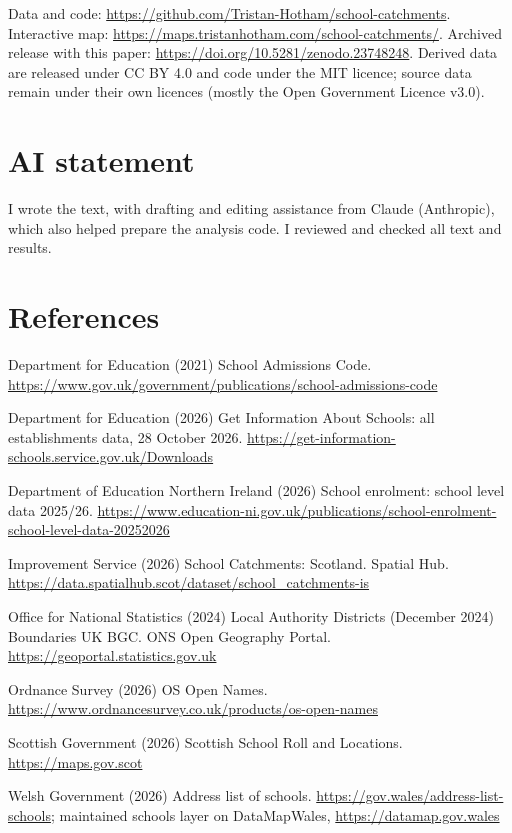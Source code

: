 \documentclass[11pt,a4paper]{article}
\begin{document}
Data and code: \url{https://github.com/Tristan-Hotham/school-catchments}. Interactive map: \url{https://maps.tristanhotham.com/school-catchments/}. Archived release with this paper: \url{https://doi.org/10.5281/zenodo.23748248}. Derived data are released under CC BY 4.0 and code under the MIT licence; source data remain under their own licences (mostly the Open Government Licence v3.0).

\section*{AI statement}

I wrote the text, with drafting and editing assistance from Claude (Anthropic), which also helped prepare the analysis code. I reviewed and checked all text and results.

\section*{References}
\small
Department for Education (2021) School Admissions Code. \url{https://www.gov.uk/government/publications/school-admissions-code}

Department for Education (2026) Get Information About Schools: all establishments data, 28 October 2026. \url{https://get-information-schools.service.gov.uk/Downloads}

Department of Education Northern Ireland (2026) School enrolment: school level data 2025/26. \url{https://www.education-ni.gov.uk/publications/school-enrolment-school-level-data-20252026}

Improvement Service (2026) School Catchments: Scotland. Spatial Hub. \url{https://data.spatialhub.scot/dataset/school_catchments-is}

Office for National Statistics (2024) Local Authority Districts (December 2024) Boundaries UK BGC. ONS Open Geography Portal. \url{https://geoportal.statistics.gov.uk}

Ordnance Survey (2026) OS Open Names. \url{https://www.ordnancesurvey.co.uk/products/os-open-names}

Scottish Government (2026) Scottish School Roll and Locations. \url{https://maps.gov.scot}

Welsh Government (2026) Address list of schools. \url{https://gov.wales/address-list-schools}; maintained schools layer on DataMapWales, \url{https://datamap.gov.wales}
\end{document}
